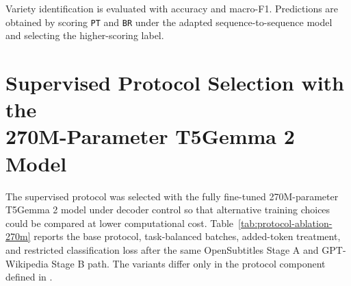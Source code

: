 Variety identification is evaluated with accuracy and macro-F1. Predictions are
obtained by scoring \texttt{PT} and \texttt{BR} under the adapted
sequence-to-sequence model and selecting the higher-scoring label.

\section[Supervised Protocol Selection with the 270M-Parameter T5Gemma 2 Model]{Supervised Protocol Selection with the\\270M-Parameter T5Gemma 2 Model}
\label{sec:smaller-model-protocol-study}

The supervised protocol was selected with the fully fine-tuned 270M-parameter
T5Gemma 2 model under decoder control so that alternative training choices
could be compared at lower computational cost. Table~\ref{tab:protocol-ablation-270m} reports the
base protocol, task-balanced batches, added-token treatment, and restricted
classification loss after the same OpenSubtitles Stage A and GPT-Wikipedia
Stage B path. The variants differ only in the protocol component defined in
.

